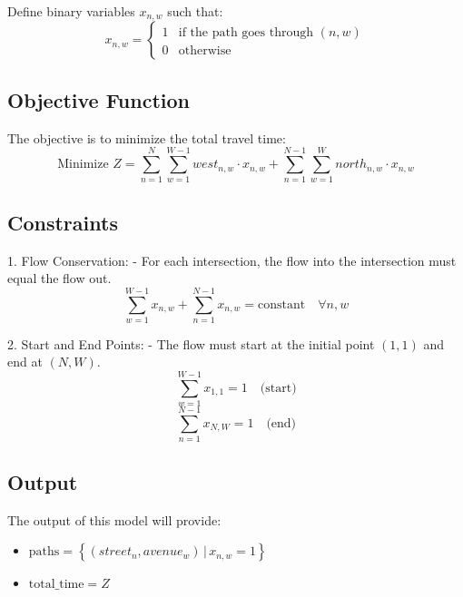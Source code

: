 \documentclass{article}
\begin{document}
Define binary variables \(x_{n,w}\) such that:
\[
x_{n,w} =
\begin{cases}
1 & \text{if the path goes through } (n, w) \\
0 & \text{otherwise}
\end{cases}
\]

\subsection*{Objective Function}

The objective is to minimize the total travel time:
\[
\text{Minimize } Z = \sum_{n=1}^{N} \sum_{w=1}^{W-1} west_{n,w} \cdot x_{n,w} + \sum_{n=1}^{N-1} \sum_{w=1}^{W} north_{n,w} \cdot x_{n,w}
\]

\subsection*{Constraints}

1. Flow Conservation:
   - For each intersection, the flow into the intersection must equal the flow out.
   \[
   \sum_{w=1}^{W-1} x_{n,w} + \sum_{n=1}^{N-1} x_{n,w} = \text{constant} \quad \forall n, w
   \]

2. Start and End Points:
   - The flow must start at the initial point \((1,1)\) and end at \((N,W)\).
   \[
   \sum_{w=1}^{W-1} x_{1,1} = 1 \quad \text{(start)}
   \]
   \[
   \sum_{n=1}^{N-1} x_{N, W} = 1 \quad \text{(end)}
   \]

\subsection*{Output}

The output of this model will provide:
\begin{itemize}
    \item \( \text{paths} = \left\{ (street_{n}, avenue_{w}) \,|\, x_{n,w} = 1 \right\} \)
    \item \( \text{total\_time} = Z \)
\end{itemize}
\end{document}
